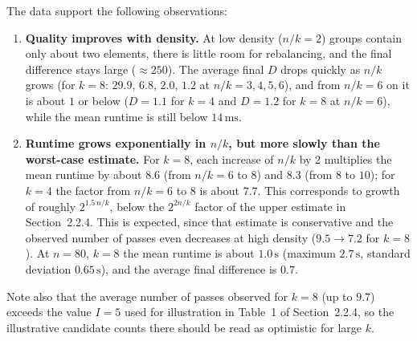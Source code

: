 \documentclass[11pt,a4paper]{article}
\begin{document}
The data support the following observations:
\begin{enumerate}[label=(\alph*)]
\item \textbf{Quality improves with density.} At low density ($n/k=2$) groups contain only about two elements, there is little room for rebalancing, and the final difference stays large ($\approx 250$). The average final $D$ drops quickly as $n/k$ grows (for $k=8$: $29.9$, $6.8$, $2.0$, $1.2$ at $n/k=3,4,5,6$), and from $n/k=6$ on it is about $1$ or below ($D=1.1$ for $k=4$ and $D=1.2$ for $k=8$ at $n/k=6$), while the mean runtime is still below $14\,\text{ms}$.
\item \textbf{Runtime grows exponentially in $n/k$, but more slowly than the worst-case estimate.} For $k=8$, each increase of $n/k$ by $2$ multiplies the mean runtime by about $8.6$ (from $n/k=6$ to $8$) and $8.3$ (from $8$ to $10$); for $k=4$ the factor from $n/k=6$ to $8$ is about $7.7$. This corresponds to growth of roughly $2^{1.5\,n/k}$, below the $2^{2n/k}$ factor of the upper estimate in Section~2.2.4. This is expected, since that estimate is conservative and the observed number of passes even decreases at high density ($9.5\to 7.2$ for $k=8$). At $n=80$, $k=8$ the mean runtime is about $1.0\,\text{s}$ (maximum $2.7\,\text{s}$, standard deviation $0.65\,\text{s}$), and the average final difference is $0.7$.
\end{enumerate}
Note also that the average number of passes observed for $k=8$ (up to $9.7$) exceeds the value $I=5$ used for illustration in Table~1 of Section~2.2.4, so the illustrative candidate counts there should be read as optimistic for large $k$.
\end{document}
